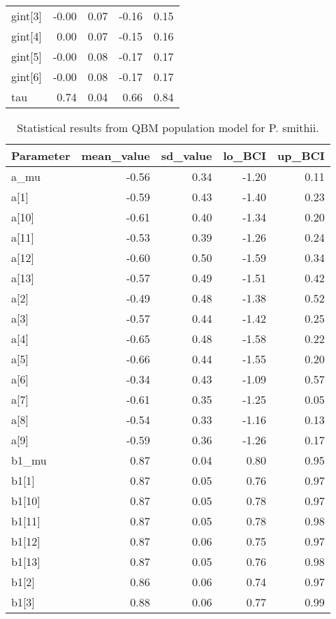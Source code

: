 \documentclass[12pt,]{article}
\begin{document}
\begin{table}[ht]
{\begin{tabular}{lrrrr}
  gint[3] & -0.00 & 0.07 & -0.16 & 0.15 \\ 
  gint[4] & 0.00 & 0.07 & -0.15 & 0.16 \\ 
  gint[5] & -0.00 & 0.08 & -0.17 & 0.17 \\ 
  gint[6] & -0.00 & 0.08 & -0.17 & 0.17 \\ 
  tau & 0.74 & 0.04 & 0.66 & 0.84 \\ 
   \hline
\end{tabular}
}
\end{table}\begin{table}[ht]
\centering
\caption{Statistical results from QBM population model for P. smithii.} 
{\footnotesize
\begin{tabular}{lrrrr}
  \hline
Parameter & mean\_value & sd\_value & lo\_BCI & up\_BCI \\ 
  \hline
a\_mu & -0.56 & 0.34 & -1.20 & 0.11 \\ 
  a[1] & -0.59 & 0.43 & -1.40 & 0.23 \\ 
  a[10] & -0.61 & 0.40 & -1.34 & 0.20 \\ 
  a[11] & -0.53 & 0.39 & -1.26 & 0.24 \\ 
  a[12] & -0.60 & 0.50 & -1.59 & 0.34 \\ 
  a[13] & -0.57 & 0.49 & -1.51 & 0.42 \\ 
  a[2] & -0.49 & 0.48 & -1.38 & 0.52 \\ 
  a[3] & -0.57 & 0.44 & -1.42 & 0.25 \\ 
  a[4] & -0.65 & 0.48 & -1.58 & 0.22 \\ 
  a[5] & -0.66 & 0.44 & -1.55 & 0.20 \\ 
  a[6] & -0.34 & 0.43 & -1.09 & 0.57 \\ 
  a[7] & -0.61 & 0.35 & -1.25 & 0.05 \\ 
  a[8] & -0.54 & 0.33 & -1.16 & 0.13 \\ 
  a[9] & -0.59 & 0.36 & -1.26 & 0.17 \\ 
  b1\_mu & 0.87 & 0.04 & 0.80 & 0.95 \\ 
  b1[1] & 0.87 & 0.05 & 0.76 & 0.97 \\ 
  b1[10] & 0.87 & 0.05 & 0.78 & 0.97 \\ 
  b1[11] & 0.87 & 0.05 & 0.78 & 0.98 \\ 
  b1[12] & 0.87 & 0.06 & 0.75 & 0.97 \\ 
  b1[13] & 0.87 & 0.05 & 0.76 & 0.98 \\ 
  b1[2] & 0.86 & 0.06 & 0.74 & 0.97 \\ 
  b1[3] & 0.88 & 0.06 & 0.77 & 0.99 \\ 

\end{tabular}}
\end{table}
\end{document}

